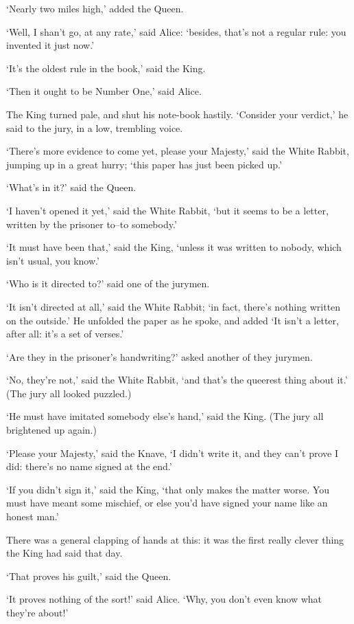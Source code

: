 \documentclass[statementpaper,twoside,openany]{memoir}
\begin{document}
`Nearly two miles high,' added the Queen.

`Well, I shan't go, at any rate,' said Alice: `besides, that's not a regular rule: you invented it just now.'

`It's the oldest rule in the book,' said the King.

`Then it ought to be Number One,' said Alice.

The King turned pale, and shut his note-book hastily. `Consider your verdict,' he said to the jury, in a low, trembling voice.

`There's more evidence to come yet, please your Majesty,' said the White Rabbit, jumping up in a great hurry; `this paper has just been picked up.'

`What's in it?' said the Queen.

`I haven't opened it yet,' said the White Rabbit, `but it seems to be a letter, written by the prisoner to--to somebody.'

`It must have been that,' said the King, `unless it was written to nobody, which isn't usual, you know.'

`Who is it directed to?' said one of the jurymen.

`It isn't directed at all,' said the White Rabbit; `in fact, there's nothing written on the outside.' He unfolded the paper as he spoke, and added `It isn't a letter, after all: it's a set of verses.'

`Are they in the prisoner's handwriting?' asked another of they jurymen.

`No, they're not,' said the White Rabbit, `and that's the queerest thing about it.' (The jury all looked puzzled.)

`He must have imitated somebody else's hand,' said the King. (The jury all brightened up again.)

`Please your Majesty,' said the Knave, `I didn't write it, and they can't prove I did: there's no name signed at the end.'

`If you didn't sign it,' said the King, `that only makes the matter worse. You must have meant some mischief, or else you'd have signed your name like an honest man.'

There was a general clapping of hands at this: it was the first really clever thing the King had said that day.

`That proves his guilt,' said the Queen.

`It proves nothing of the sort!' said Alice. `Why, you don't even know what they're about!'
\end{document}
